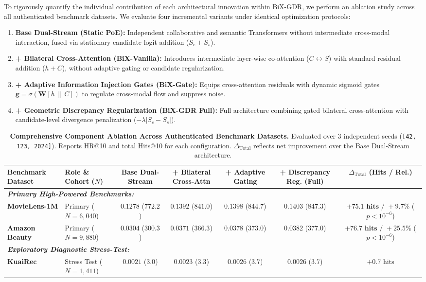 To rigorously quantify the individual contribution of each architectural innovation within BiX-GDR, we perform an ablation study across all authenticated benchmark datasets. We evaluate four incremental variants under identical optimization protocols:
\begin{enumerate}[leftmargin=*]
    \item \textbf{Base Dual-Stream (Static PoE):} Independent collaborative and semantic Transformers without intermediate cross-modal interaction, fused via stationary candidate logit addition ($S_c + S_s$).
    \item \textbf{+ Bilateral Cross-Attention (BiX-Vanilla):} Introduces intermediate layer-wise co-attention ($C \leftrightarrow S$) with standard residual addition ($h + C$), without adaptive gating or candidate regularization.
    \item \textbf{+ Adaptive Information Injection Gates (BiX-Gate):} Equips cross-attention residuals with dynamic sigmoid gates $\mathbf{g} = \sigma(\mathbf{W}[h \,\|\, C])$ to regulate cross-modal flow and suppress noise.
    \item \textbf{+ Geometric Discrepancy Regularization (BiX-GDR Full):} Full architecture combining gated bilateral cross-attention with candidate-level divergence penalization ($-\lambda |S_c - S_s|$).
\end{enumerate}

\begin{table}[t]
\centering
\small
\caption{\textbf{Comprehensive Component Ablation Across Authenticated Benchmark Datasets.} Evaluated over 3 independent seeds (\texttt{[42, 123, 2024]}). Reports HR@10 and total Hits@10 for each configuration. $\Delta_{\text{Total}}$ reflects net improvement over the Base Dual-Stream architecture.}
\label{tab:cross_dataset_ablation}
\begin{tabular}{llccccc}
\toprule
\textbf{Benchmark Dataset} & \textbf{Role \& Cohort ($N$)} & \textbf{Base Dual-Stream} & \textbf{+ Bilateral Cross-Attn} & \textbf{+ Adaptive Gating} & \textbf{+ Discrepancy Reg. (Full)} & \textbf{$\Delta_{\text{Total}}$ (Hits / Rel.)} \\
\midrule
\multicolumn{7}{l}{\textit{\textbf{Primary High-Powered Benchmarks:}}} \\
\textbf{MovieLens-1M} & Primary ($N=6{,}040$) & $0.1278$ ($772.2$) & $0.1392$ ($841.0$) & $0.1398$ ($844.7$) & $\mathbf{0.1403}$ ($\mathbf{847.3}$) & $\mathbf{+75.1\text{ hits / }+9.7\%}$ ($p < 10^{-6}$) \\
\textbf{Amazon Beauty} & Primary ($N=9{,}880$) & $0.0304$ ($300.3$) & $0.0371$ ($366.3$) & $0.0378$ ($373.0$) & $\mathbf{0.0382}$ ($\mathbf{377.0}$) & $\mathbf{+76.7\text{ hits / }+25.5\%}$ ($p < 10^{-6}$) \\
\midrule
\multicolumn{7}{l}{\textit{\textbf{Exploratory Diagnostic Stress-Test:}}} \\
\textbf{KuaiRec} & Stress Test ($N=1{,}411$) & $0.0021$ ($3.0$) & $0.0023$ ($3.3$) & $0.0026$ ($3.7$) & $\mathbf{0.0026}$ ($\mathbf{3.7}$) & $+0.7\text{ hits}$ \\
\bottomrule
\end{tabular}
\end{table}

